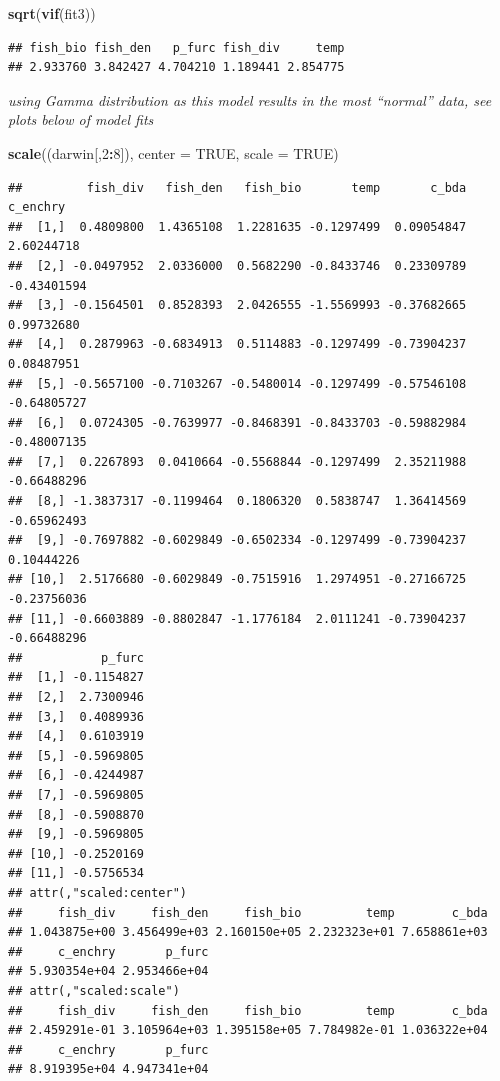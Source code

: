 \documentclass[]{article}
\newenvironment{Shaded}{\begin{snugshade}}{\end{snugshade}}
\newcommand{\KeywordTok}[1]{\textcolor[rgb]{0.13,0.29,0.53}{\textbf{#1}}}
\newcommand{\DataTypeTok}[1]{\textcolor[rgb]{0.13,0.29,0.53}{#1}}
\newcommand{\DecValTok}[1]{\textcolor[rgb]{0.00,0.00,0.81}{#1}}
\newcommand{\OtherTok}[1]{\textcolor[rgb]{0.56,0.35,0.01}{#1}}
\newcommand{\OperatorTok}[1]{\textcolor[rgb]{0.81,0.36,0.00}{\textbf{#1}}}
\newcommand{\NormalTok}[1]{#1}
\begin{document}
\begin{Shaded}
\begin{Highlighting}[]
\KeywordTok{sqrt}\NormalTok{(}\KeywordTok{vif}\NormalTok{(fit3))}
\end{Highlighting}
\end{Shaded}

\begin{verbatim}
## fish_bio fish_den   p_furc fish_div     temp 
## 2.933760 3.842427 4.704210 1.189441 2.854775
\end{verbatim}

\emph{using Gamma distribution as this model results in the most
``normal'' data, see plots below of model fits}

\begin{Shaded}
\begin{Highlighting}[]
\KeywordTok{scale}\NormalTok{((darwin[,}\DecValTok{2}\OperatorTok{:}\DecValTok{8}\NormalTok{]), }\DataTypeTok{center =} \OtherTok{TRUE}\NormalTok{, }\DataTypeTok{scale =} \OtherTok{TRUE}\NormalTok{)}
\end{Highlighting}
\end{Shaded}

\begin{verbatim}
##         fish_div   fish_den   fish_bio       temp       c_bda    c_enchry
##  [1,]  0.4809800  1.4365108  1.2281635 -0.1297499  0.09054847  2.60244718
##  [2,] -0.0497952  2.0336000  0.5682290 -0.8433746  0.23309789 -0.43401594
##  [3,] -0.1564501  0.8528393  2.0426555 -1.5569993 -0.37682665  0.99732680
##  [4,]  0.2879963 -0.6834913  0.5114883 -0.1297499 -0.73904237  0.08487951
##  [5,] -0.5657100 -0.7103267 -0.5480014 -0.1297499 -0.57546108 -0.64805727
##  [6,]  0.0724305 -0.7639977 -0.8468391 -0.8433703 -0.59882984 -0.48007135
##  [7,]  0.2267893  0.0410664 -0.5568844 -0.1297499  2.35211988 -0.66488296
##  [8,] -1.3837317 -0.1199464  0.1806320  0.5838747  1.36414569 -0.65962493
##  [9,] -0.7697882 -0.6029849 -0.6502334 -0.1297499 -0.73904237  0.10444226
## [10,]  2.5176680 -0.6029849 -0.7515916  1.2974951 -0.27166725 -0.23756036
## [11,] -0.6603889 -0.8802847 -1.1776184  2.0111241 -0.73904237 -0.66488296
##           p_furc
##  [1,] -0.1154827
##  [2,]  2.7300946
##  [3,]  0.4089936
##  [4,]  0.6103919
##  [5,] -0.5969805
##  [6,] -0.4244987
##  [7,] -0.5969805
##  [8,] -0.5908870
##  [9,] -0.5969805
## [10,] -0.2520169
## [11,] -0.5756534
## attr(,"scaled:center")
##     fish_div     fish_den     fish_bio         temp        c_bda 
## 1.043875e+00 3.456499e+03 2.160150e+05 2.232323e+01 7.658861e+03 
##     c_enchry       p_furc 
## 5.930354e+04 2.953466e+04 
## attr(,"scaled:scale")
##     fish_div     fish_den     fish_bio         temp        c_bda 
## 2.459291e-01 3.105964e+03 1.395158e+05 7.784982e-01 1.036322e+04 
##     c_enchry       p_furc 
## 8.919395e+04 4.947341e+04
\end{verbatim}
\end{document}
